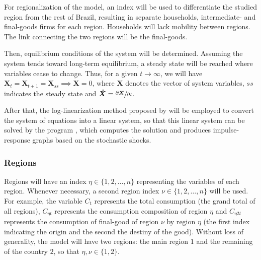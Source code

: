 \documentclass[../thesis.tex]{subfiles}
\begin{document}
	For regionalization of the model, an index will be used to differentiate the studied region from the rest of Brazil, resulting in separate households, intermediate- and final-goods firms for each region. Households will lack mobility between regions. The link connecting the two regions will be the final-goods.
	
	Then, equilibrium conditions of the system will be determined. Assuming the system tends toward long-term equilibrium, a steady state will be reached where variables cease to change. Thus, for a given $t \longrightarrow \infty$, we will have $\boldsymbol{X}_t = \boldsymbol{X}_{t+1} = \boldsymbol{X}_{ss} \implies \boldsymbol{\dot{X}} = 0$, where $\boldsymbol{X}$ denotes the vector of system variables, $ss$ indicates the steady state and $\boldsymbol{\dot{X}} = \sfrac{\partial \boldsymbol{X}}{\partial t}$. 
	
	After that, the log-linearization method proposed by \textcite{uhlig_toolkit_1999} will be employed to convert the system of equations into a linear system, so that this linear system can be solved by the program \dynare{}, which computes the solution and produces impulse-response graphs based on the stochastic shocks.

	
\subsubsection*{Regions}\label{sec:regions}

	
	
	Regions will have an index $\eta \in \{1,2,\ldots,n\}$ representing the variables of each region. Whenever necessary, a second region index $\nu \in \{1,2,\ldots,n\}$ will be used. For example, the variable $C_{t}$ represents the total consumption (the grand total of all regions), $C_{\eta t}$ represents the consumption composition of region $\eta$ and $C_{\eta 2 t}$ represents the consumption of final-good of region $\nu$ by region $\eta$ (the first index indicating the origin and the second the destiny of the good). Without loss of generality, the model will have two regions: the main region $1$ and the remaining of the country $2$, so that $\eta,\nu \in \{1,2\}$.
\end{document}
